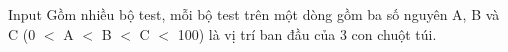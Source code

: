 Input
Gồm nhiều bộ test, mỗi bộ test trên một dòng gồm ba số nguyên A, B và C (0 $<$ A $<$ B $<$ C $<$ 100) là vị trí ban đầu của 3 con chuột túi.